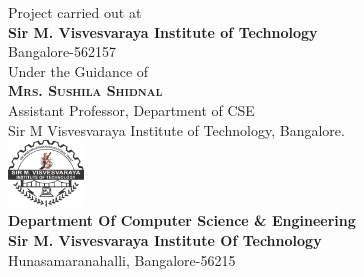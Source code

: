 \begin{titlepage}
	\Large{Project carried out at\\
		\textbf{Sir M. Visvesvaraya Institute of Technology}
		\\Bangalore-562157
	}\\[10pt]
	\Large{Under the Guidance of\\
		\textbf{\textsc{\Large Mrs. Sushila Shidnal }}\\
		Assistant Professor, Department of CSE\\
		Sir M Visvesvaraya Institute of Technology, Bangalore.
	}\\[10pt]
	\includegraphics[width=0.15\textwidth]{images/mvit.png}\\[10pt] 
	\Large{
		\textbf{Department Of Computer Science \& Engineering}\\
		\textbf{Sir M. Visvesvaraya Institute Of Technology}\\
		Hunasamaranahalli, Bangalore-56215\\
	}

\end{titlepage}

